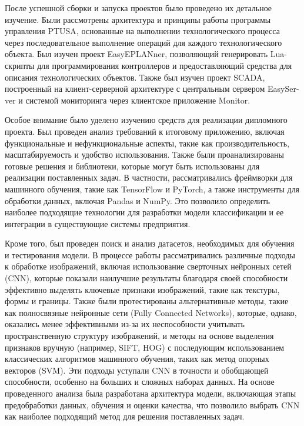 {\par \redline После успешной сборки и запуска проектов было проведено их детальное изучение. Были рассмотрены архитектура и принципы работы программы управления PTUSA, основанные на выполнении технологического процесса через последовательное выполнение операций для каждого технологического объекта. Был изучен проект EasyEPLANner, позволяющий генерировать Lua-скрипты для программирования контроллеров и предоставляющий средства для описания технологических объектов. Также был изучен проект SCADA, построенный на клиент-серверной архитектуре с центральным сервером EasySer- ver и системой мониторинга через клиентское приложение Monitor.

\par \redline Особое внимание было уделено изучению средств для реализации дипломного проекта. Был проведен анализ требований к итоговому приложению, включая функциональные и нефункциональные аспекты, такие как производительность, масштабируемость и удобство использования. Также были проанализированы готовые решения и библиотеки, которые могут быть использованы для реализации поставленных задач. В частности, рассматривались фреймворки для машинного обучения, такие как TensorFlow и PyTorch, а также инструменты для обработки данных, включая Pandas и NumPy. Это позволило определить наиболее подходящие технологии для разработки модели классификации и ее интеграции в существующие системы предприятия.

\par \redline Кроме того, был проведен поиск и анализ датасетов, необходимых для обучения и тестирования модели. В процессе работы рассматривались различные подходы к обработке изображений, включая использование сверточных нейронных сетей (CNN), которые показали наилучшие результаты благодаря своей способности эффективно выделять ключевые признаки изображений, такие как текстуры, формы и границы. Также были протестированы альтернативные методы, такие как полносвязные нейронные сети (Fully Connected Networks), которые, однако, оказались менее эффективными из-за их неспособности учитывать пространственную структуру изображений, и методы на основе выделения признаков вручную (например, SIFT, HOG) с последующим использованием классических алгоритмов машинного обучения, таких как метод опорных векторов (SVM). Эти подходы уступали CNN в точности и обобщающей способности, особенно на больших и сложных наборах данных. На основе проведенного анализа была разработана архитектура модели, включающая этапы предобработки данных, обучения и оценки качества, что позволило выбрать CNN как наиболее подходящий метод для решения поставленных задач.

}
